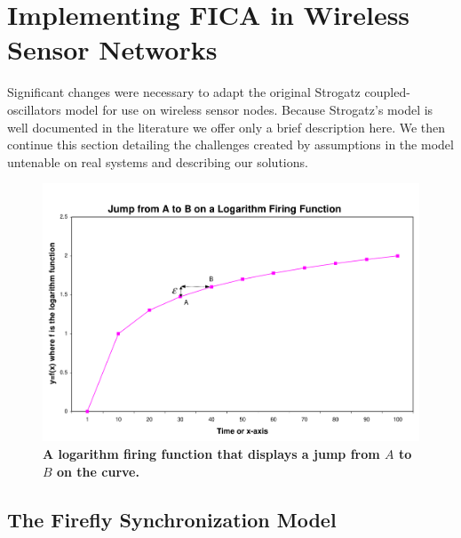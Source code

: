 \section{Implementing FICA in Wireless Sensor Networks}
\label{sec:fits}

Significant changes were necessary to adapt the original Strogatz
coupled-oscillators model for use on wireless sensor nodes.  Because
Strogatz's model is well documented in the literature we offer only a brief
description here.  We then continue this section detailing the challenges
created by assumptions in the model untenable on real systems and describing
our solutions.

\begin{figure}[t]
\begin{center}
\includegraphics[width=0.9\hsize]{./figures/excelFiringFunc.pdf}
\end{center}
\caption{{\small {\bf A logarithm firing function that displays
a jump from $A$ to $B$ on the curve.}}} 
\label{fig:firingFunc}
\end{figure}

\subsection{The Firefly Synchronization Model}
\label{sec:fireflyModel}

